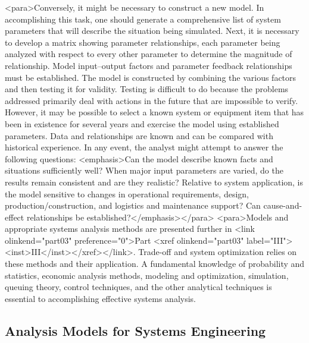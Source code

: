 <para>Conversely, it might be necessary to construct a new model. In accomplishing this task, one should generate a comprehensive list of system parameters that will describe the situation being simulated. Next, it is necessary to develop a matrix showing parameter relationships, each parameter being analyzed with respect to every other parameter to determine the magnitude of relationship. Model input–output factors and parameter feedback relationships must be established. The model is constructed by combining the various factors and then testing it for validity. Testing is difficult to do because the problems addressed primarily deal with actions in the future that are impossible to verify. However, it may be possible to select a known system or equipment item that has been in existence for several years and exercise the model using established parameters. Data and relationships are known and can be compared with historical experience. In any event, the analyst might attempt to answer the following questions: <emphasis>Can the model describe known facts and situations sufficiently well? When major input parameters are varied, do the results remain consistent and are they realistic? Relative to system application, is the model sensitive to changes in operational requirements, design, production/construction, and logistics and maintenance support? Can cause-and-effect relationships be established?</emphasis></para>
<para>Models and appropriate systems analysis methods are presented further in <link olinkend="part03" preference="0">Part <xref olinkend="part03" label="III"><inst>III</inst></xref></link>. Trade-off and system optimization relies on these methods and their application. A fundamental knowledge of probability and statistics, economic analysis methods, modeling and optimization, simulation, queuing theory, control techniques, and the other analytical techniques is essential to accomplishing effective systems analysis.

\subsection{Analysis Models for Systems Engineering}